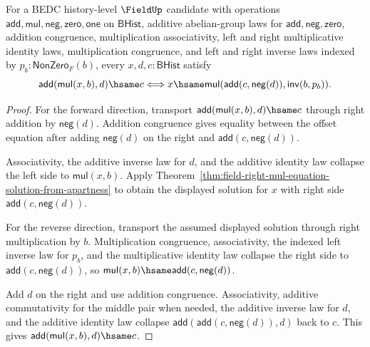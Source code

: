 \begin{theorem}
\label{thm:field-affine-right-equation-exact-from-apartness}
For a BEDC history-level $\FieldUp$ candidate with operations
$\mathsf{add},\mathsf{mul},\mathsf{neg},\mathsf{zero},\mathsf{one}$ on
$\mathsf{BHist}$, additive abelian-group laws for
$\mathsf{add},\mathsf{neg},\mathsf{zero}$, addition congruence,
multiplication associativity, left and right multiplicative identity laws,
multiplication congruence, and left and right inverse laws indexed by
$p_b:\mathsf{NonZero}_F(b)$, every
$x,d,c:\mathsf{BHist}$ satisfy
$$
\mathsf{add}(\mathsf{mul}(x,b),d)\hsame c
\Longleftrightarrow
x\hsame
\mathsf{mul}(\mathsf{add}(c,\mathsf{neg}(d)),\mathsf{inv}(b,p_b)).
$$
\end{theorem}
\begin{proof}
For the forward direction, transport
$\mathsf{add}(\mathsf{mul}(x,b),d)\hsame c$ through right addition by
$\mathsf{neg}(d)$. Addition congruence gives equality between the offset
equation after adding $\mathsf{neg}(d)$ on the right and
$\mathsf{add}(c,\mathsf{neg}(d))$.

Associativity, the additive inverse law for $d$, and the additive identity
law collapse the left side to $\mathsf{mul}(x,b)$. Apply
Theorem~\ref{thm:field-right-mul-equation-solution-from-apartness} to obtain
the displayed solution for $x$ with right side
$\mathsf{add}(c,\mathsf{neg}(d))$.

For the reverse direction, transport the assumed displayed solution through
right multiplication by $b$. Multiplication congruence, associativity, the
indexed left inverse law for $p_b$, and the multiplicative identity law
collapse the right side to $\mathsf{add}(c,\mathsf{neg}(d))$, so
$\mathsf{mul}(x,b)\hsame\mathsf{add}(c,\mathsf{neg}(d))$.

Add $d$ on the right and use addition congruence. Associativity, additive
commutativity for the middle pair when needed, the additive inverse law for
$d$, and the additive identity law collapse
$\mathsf{add}(\mathsf{add}(c,\mathsf{neg}(d)),d)$ back to $c$. This gives
$\mathsf{add}(\mathsf{mul}(x,b),d)\hsame c$.
\end{proof}

